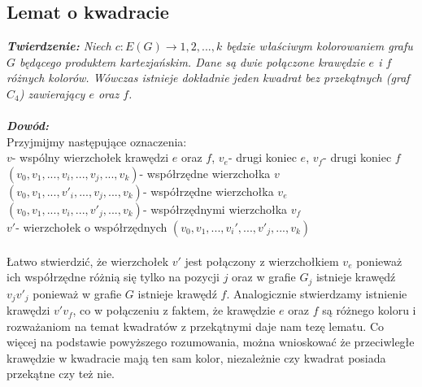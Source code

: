 \documentclass[12pt,a4paper,titlepage]{article}
\begin{document}
\subsection{Lemat o kwadracie}
\textit{\textbf{Twierdzenie:} Niech $c: E(G) \rightarrow {1,2,...,k}$ będzie właściwym kolorowaniem grafu $G$ będącego produktem kartezjańskim. Dane są dwie połączone krawędzie $e$ i $f$ różnych kolorów. Wówczas istnieje dokładnie jeden kwadrat bez przekątnych (graf $C_4$) zawierający $e$ oraz $f$.}\\
\\
\textit{\textbf{Dowód:}}\\
Przyjmijmy następujące oznaczenia:\\
$v$- wspólny wierzchołek krawędzi $e$ oraz $f$, $v_e$- drugi koniec $e$, $v_f$- drugi koniec $f$\\
$(v_0 , v_1, ... ,v_i, ..., v_j,...,v_k )$- współrzędne wierzchołka $v$\\
$(v_0 , v_1, ... ,v'_i, ..., v_j,...,v_k )$- współrzędne wierzchołka $v_e$\\
$(v_0 , v_1, ... ,v_i, ..., v'_j,...,v_k )$- współrzędnymi wierzchołka $v_f$\\
$v'$- wierzchołek o współrzędnych $(v_0 , v_1, ... ,v_i', ..., v'_j,...,v_k )$\\ 
\\
Łatwo stwierdzić, że wierzchołek $v'$ jest połączony z wierzchołkiem $v_e$ ponieważ ich współrzędne różnią się tylko na pozycji $j$ oraz w grafie $G_j$ istnieje krawędź $v_j v'_j$ ponieważ w grafie $G$ istnieje krawędź $f$. Analogicznie stwierdzamy istnienie krawędzi $v'v_f$, co w połączeniu z faktem, że krawędzie $e$ oraz $f$ są różnego koloru i rozważaniom na temat kwadratów z przekątnymi daje nam tezę lematu. Co więcej na podstawie powyższego rozumowania, można wnioskować że przeciwległe krawędzie w kwadracie mają ten sam kolor, niezależnie czy kwadrat posiada przekątne czy też nie.\\
\end{document}

